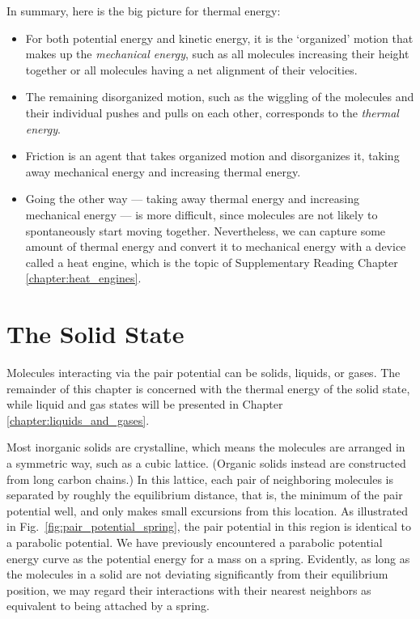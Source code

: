 In summary, here is the big picture for thermal energy:
\begin{itemize}
\item For both potential energy and kinetic energy, it is the
  `organized' motion that makes up the {\it mechanical energy}, such as
  all molecules increasing their height together or all molecules
  having a net alignment of their velocities.
\item The remaining disorganized motion, such as the wiggling of the
  mole\-cules and their individual pushes and pulls on each other,
  corresponds to the {\it thermal energy}.
\item Friction is an agent that takes organized motion and
  disorganizes it, taking away mechanical energy and increasing thermal
  energy.
\item Going the other way --- taking away thermal energy and
  increasing mechanical energy --- is more difficult, since molecules
  are not likely to spontaneously start moving together.
  Nevertheless, we can capture some amount of thermal energy and
  convert it to mechanical energy with a device called a heat engine,
  which is the topic of Supplementary Reading Chapter
  \ref{chapter:heat_engines}.
\end{itemize}

\section{The Solid State}

\label{section:the_solid_state}

Molecules interacting via the pair potential can be solids, liquids,
or gases.  The remainder of this chapter is concerned with the thermal
energy of the solid state, while liquid and gas states will be
presented in Chapter \ref{chapter:liquids_and_gases}.


Most inorganic solids are crystalline, which means the molecules are
arranged in a symmetric way, such as a cubic lattice.  (Organic
  solids instead are constructed from long carbon chains.)  In this
lattice, each pair of neighboring molecules is separated by roughly
the equilibrium distance, that is, the minimum of the pair potential
well, and only makes small excursions from this location.  As
illustrated in Fig.~\ref{fig:pair_potential_spring}, the pair
potential in this region is identical to a parabolic potential.  We
have previously encountered a parabolic potential energy curve as the
potential energy for a mass on a spring.  Evidently, as long as the
molecules in a solid are not deviating significantly from their
equilibrium position, we may regard their interactions with their
nearest neighbors as equivalent to being attached by a spring.

